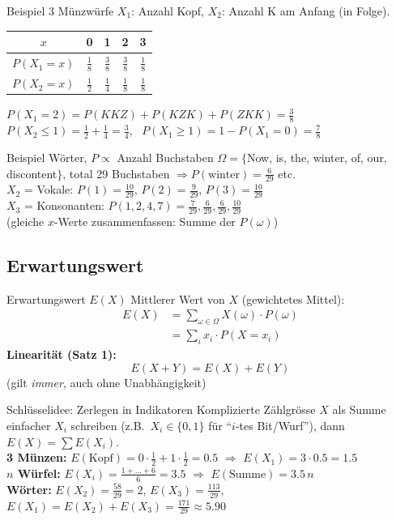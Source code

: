\documentclass[a4paper, fontsize=7pt]{scrartcl}
\begin{document}
\begin{subbox}{Beispiel 3 Münzwürfe}
$X_1$: Anzahl Kopf, $X_2$: Anzahl K am Anfang (in Folge).
\begin{center}
\begin{tabular}{@{}c|cccc@{}}
$x$ & 0 & 1 & 2 & 3 \\ \hline
$P(X_1 = x)$ & $\frac{1}{8}$ & $\frac{3}{8}$ & $\frac{3}{8}$ & $\frac{1}{8}$ \\
$P(X_2 = x)$ & $\frac{1}{2}$ & $\frac{1}{4}$ & $\frac{1}{8}$ & $\frac{1}{8}$
\end{tabular}
\end{center}
$P(X_1 = 2) = P(KKZ) + P(KZK) + P(ZKK) = \frac{3}{8}$\\
$P(X_2 \le 1) = \frac{1}{2} + \frac{1}{4} = \frac{3}{4}$, \
$P(X_1 \ge 1) = 1 - P(X_1 = 0) = \frac{7}{8}$
\end{subbox}

\begin{subbox}{Beispiel Wörter, $P \propto$ Anzahl Buchstaben}
$\Omega = \{$Now, is, the, winter, of, our, discontent$\}$, total 29
Buchstaben $\Rightarrow P(\text{winter}) = \frac{6}{29}$ etc.\\
$X_2$ = Vokale: $P(1) = \frac{10}{29}$, $P(2) = \frac{9}{29}$,
$P(3) = \frac{10}{29}$\\
$X_3$ = Konsonanten: $P(1, 2, 4, 7) = \frac{7}{29}, \frac{6}{29},
\frac{6}{29}, \frac{10}{29}$\\
(gleiche $x$-Werte zusammenfassen: Summe der $P(\omega)$)
\end{subbox}

\subsection{Erwartungswert}

\begin{mainbox}{Erwartungswert $E(X)$}
Mittlerer Wert von $X$ (gewichtetes Mittel):
\begin{align*}
E(X) &= \sum_{\omega \in \Omega} X(\omega) \cdot P(\omega)\\
     &= \sum_{i} x_i \cdot P(X = x_i)
\end{align*}
\textbf{Linearität (Satz 1):}
$$\boxed{E(X + Y) = E(X) + E(Y)}$$
(gilt \emph{immer}, auch ohne Unabhängigkeit)
\end{mainbox}

\begin{subbox}{Schlüsselidee: Zerlegen in Indikatoren}
Komplizierte Zählgrösse $X$ als Summe einfacher $X_i$ schreiben
(z.B.\ $X_i \in \{0,1\}$ für ``$i$-tes Bit/Wurf''), dann
$E(X) = \sum E(X_i)$.\\
\textbf{3 Münzen:} $E(\text{Kopf}) = 0 \cdot \frac{1}{2} + 1 \cdot
\frac{1}{2} = 0.5$ $\Rightarrow$ $E(X_1) = 3 \cdot 0.5 = 1.5$\\
\textbf{$n$ Würfel:} $E(X_i) = \frac{1 + \ldots + 6}{6} = 3.5$
$\Rightarrow$ $E(\text{Summe}) = 3.5\,n$\\
\textbf{Wörter:} $E(X_2) = \frac{58}{29} = 2$, $E(X_3) = \frac{113}{29}$,
$E(X_1) = E(X_2) + E(X_3) = \frac{171}{29} \approx 5.90$
\end{subbox}
\end{document}

